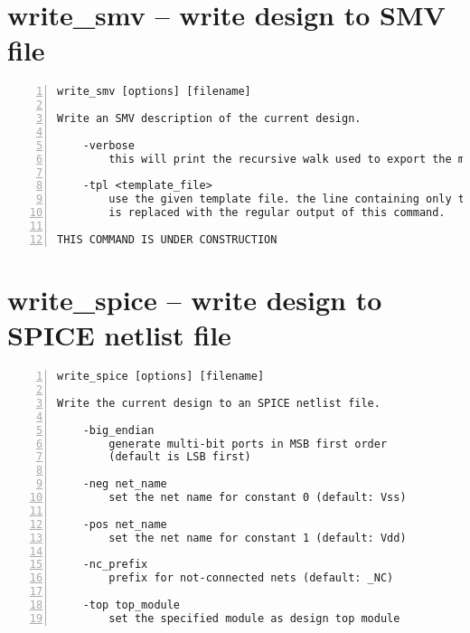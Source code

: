 \section{write\_smv -- write design to SMV file}
\label{cmd:write_smv}
\begin{lstlisting}[numbers=left,frame=single]
    write_smv [options] [filename]

Write an SMV description of the current design.

    -verbose
        this will print the recursive walk used to export the modules.

    -tpl <template_file>
        use the given template file. the line containing only the token '%%'
        is replaced with the regular output of this command.

THIS COMMAND IS UNDER CONSTRUCTION
\end{lstlisting}

\section{write\_spice -- write design to SPICE netlist file}
\label{cmd:write_spice}
\begin{lstlisting}[numbers=left,frame=single]
    write_spice [options] [filename]

Write the current design to an SPICE netlist file.

    -big_endian
        generate multi-bit ports in MSB first order
        (default is LSB first)

    -neg net_name
        set the net name for constant 0 (default: Vss)

    -pos net_name
        set the net name for constant 1 (default: Vdd)

    -nc_prefix
        prefix for not-connected nets (default: _NC)

    -top top_module
        set the specified module as design top module
\end{lstlisting}

